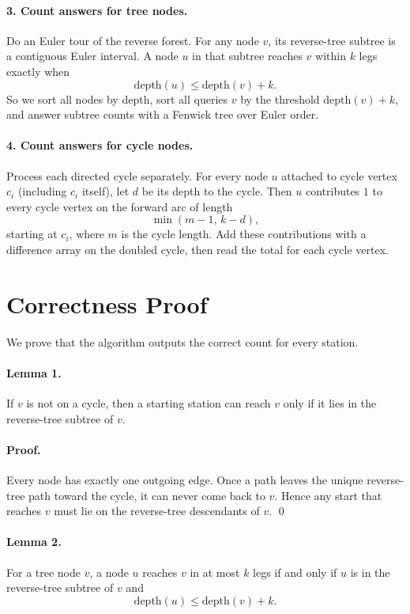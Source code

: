 \documentclass[11pt]{article}
\begin{document}
\paragraph{3. Count answers for tree nodes.}
Do an Euler tour of the reverse forest. For any node $v$, its reverse-tree subtree is a contiguous Euler interval. A node $u$ in that subtree reaches $v$ within $k$ legs exactly when
\[
\text{depth}(u) \le \text{depth}(v) + k.
\]
So we sort all nodes by depth, sort all queries $v$ by the threshold $\text{depth}(v)+k$, and answer subtree counts with a Fenwick tree over Euler order.

\paragraph{4. Count answers for cycle nodes.}
Process each directed cycle separately. For every node $u$ attached to cycle vertex $c_i$ (including $c_i$ itself), let $d$ be its depth to the cycle. Then $u$ contributes $1$ to every cycle vertex on the forward arc of length
\[
\min(m-1,\, k-d),
\]
starting at $c_i$, where $m$ is the cycle length. Add these contributions with a difference array on the doubled cycle, then read the total for each cycle vertex.

\section*{Correctness Proof}

We prove that the algorithm outputs the correct count for every station.

\paragraph{Lemma 1.}
If $v$ is not on a cycle, then a starting station can reach $v$ only if it lies in the reverse-tree subtree of $v$.

\paragraph{Proof.}
Every node has exactly one outgoing edge. Once a path leaves the unique reverse-tree path toward the cycle, it can never come back to $v$. Hence any start that reaches $v$ must lie on the reverse-tree descendants of $v$. \qed

\paragraph{Lemma 2.}
For a tree node $v$, a node $u$ reaches $v$ in at most $k$ legs if and only if $u$ is in the reverse-tree subtree of $v$ and
\[
\text{depth}(u) \le \text{depth}(v) + k.
\]
\end{document}
